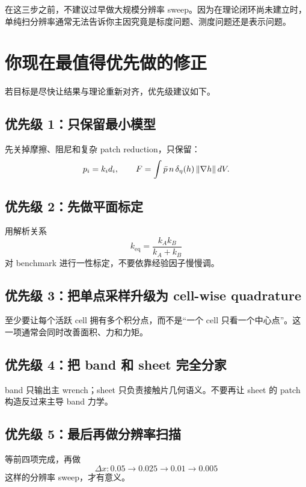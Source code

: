 \documentclass[12pt,a4paper]{ctexart}
\begin{document}
在这三步之前，不建议过早做大规模分辨率 sweep。因为在理论闭环尚未建立时，单纯扫分辨率通常无法告诉你主因究竟是标度问题、测度问题还是表示问题。

\section{你现在最值得优先做的修正}

若目标是尽快让结果与理论重新对齐，优先级建议如下。

\subsection{优先级 1：只保留最小模型}
先关掉摩擦、阻尼和复杂 patch reduction，只保留：
\begin{equation}
    p_i=k_i d_i,
    \qquad
    F = \int \bar p\,n\,\delta_\eta(h)\,\norm{\nabla h}\,dV.
\end{equation}

\subsection{优先级 2：先做平面标定}
用解析关系
\begin{equation}
    k_{\mathrm{eq}}=\frac{k_Ak_B}{k_A+k_B}
\end{equation}
对 benchmark 进行一性标定，不要依靠经验因子慢慢调。

\subsection{优先级 3：把单点采样升级为 cell-wise quadrature}
至少要让每个活跃 cell 拥有多个积分点，而不是“一个 cell 只看一个中心点”。这一项通常会同时改善面积、力和力矩。

\subsection{优先级 4：把 band 和 sheet 完全分家}
band 只输出主 wrench；sheet 只负责接触片几何语义。不要再让 sheet 的 patch 构造反过来主导 band 力学。

\subsection{优先级 5：最后再做分辨率扫描}
等前四项完成，再做
\begin{equation}
    \Delta x: 0.05 \to 0.025 \to 0.01 \to 0.005
\end{equation}
这样的分辨率 sweep，才有意义。
\end{document}
